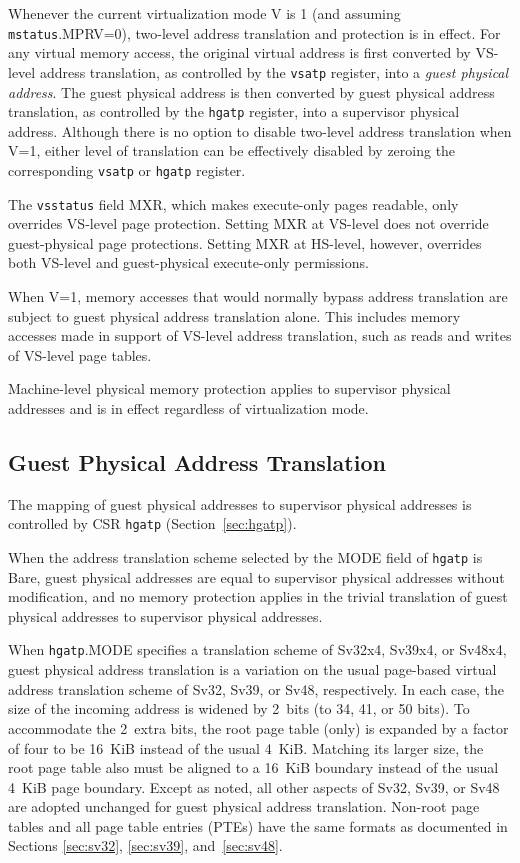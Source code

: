 Whenever the current virtualization mode V is 1 (and assuming
{\tt mstatus}.MPRV=0), two-level address translation and protection is in
effect.
For any virtual memory access, the original virtual address is first converted
by VS-level address translation, as controlled by the {\tt vsatp}
register, into a {\em guest physical address}.
The guest physical address is then converted by guest physical address
translation, as controlled by the {\tt hgatp} register, into a supervisor
physical address.
Although there is no option to disable two-level address translation when V=1,
either level of translation can be effectively disabled by zeroing the
corresponding {\tt vsatp} or {\tt hgatp} register.

The {\tt vsstatus} field MXR, which makes execute-only pages readable, only
overrides VS-level page protection.
Setting MXR at VS-level does not override guest-physical page protections.
Setting MXR at HS-level, however, overrides both VS-level and guest-physical
execute-only permissions.

When V=1, memory accesses that would normally bypass address translation are
subject to guest physical address translation alone.
This includes memory accesses made in support of VS-level address translation,
such as reads and writes of VS-level page tables.

Machine-level physical memory protection applies to supervisor physical
addresses and is in effect regardless of virtualization mode.

\subsection{Guest Physical Address Translation}
\label{sec:guest-addr-translation}

The mapping of guest physical addresses to supervisor physical addresses is
controlled by CSR {\tt hgatp} (Section~\ref{sec:hgatp}).

When the address translation scheme selected by the MODE field of {\tt hgatp}
is Bare, guest physical addresses are equal to supervisor physical addresses
without modification, and no memory protection applies in the trivial
translation of guest physical addresses to supervisor physical addresses.

When {\tt hgatp}.MODE specifies a translation scheme of Sv32x4, Sv39x4, or
Sv48x4, guest physical address translation is a variation on the usual
page-based virtual address translation scheme of Sv32, Sv39, or Sv48,
respectively.
In each case, the size of the incoming address is widened by 2~bits (to 34, 41,
or 50 bits).
To accommodate the 2~extra bits, the root page table (only) is expanded by a
factor of four to be 16~KiB instead of the usual 4~KiB.
Matching its larger size, the root page table also must be aligned to a 16~KiB
boundary instead of the usual 4~KiB page boundary.
Except as noted, all other aspects of Sv32, Sv39, or Sv48 are adopted unchanged
for guest physical address translation.
Non-root page tables and all page table entries (PTEs) have the same formats as
documented in Sections \ref{sec:sv32}, \ref{sec:sv39}, and~\ref{sec:sv48}.

